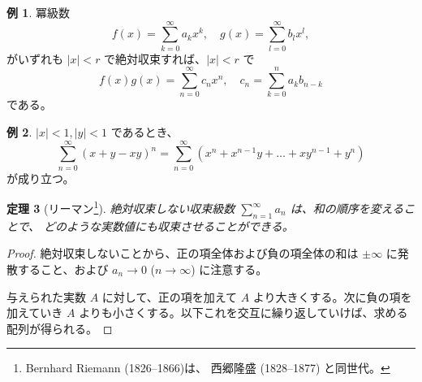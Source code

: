 \documentclass[a4paper]{jsarticle}
\newtheorem{Theorem}{定理}[section]
\theoremstyle{definition}
\newtheorem{Example}[Theorem]{例}
\newtheorem{Exercise}{問}%
\theoremstyle{remark}
\begin{document}
\begin{Example}
冪級数
\[
f(x) = \sum_{k=0}^\infty a_kx^k, 
\quad 
g(x) = \sum_{l=0}^\infty b_lx^l, 
\]
がいずれも $|x| < r$ で絶対収束すれば、$|x| < r$ で
\[
f(x)g(x) = \sum_{n=0}^\infty c_n x^n, 
\quad 
c_n = \sum_{k=0}^n a_k b_{n-k}
\]
である。
\end{Example} 



\begin{Example}
$|x| < 1, |y| < 1$ であるとき、
\[
\sum_{n=0}^\infty (x+y-xy)^n = \sum_{n=0}^\infty 
(x^n + x^{n-1}y + \dots + xy^{n-1} + y^n)
\]
が成り立つ。
\end{Example}


\begin{Theorem}[リーマン\footnote{Bernhard Riemann (1826--1866)は、
西郷隆盛 (1828--1877) と同世代。}]
絶対収束しない収束級数 $\sum_{n=1}^\infty a_n$ は、和の順序を変えることで、
どのような実数値にも収束させることができる。
\end{Theorem} 

\begin{proof}
絶対収束しないことから、正の項全体および負の項全体の和は $\pm\infty$ に発散すること、および
$a_n \to 0$ ($n \to \infty$) に注意する。

与えられた実数 $A$ に対して、正の項を加えて $A$ より大きくする。次に負の項を加えていき
$A$ よりも小さくする。以下これを交互に繰り返していけば、求める配列が得られる。
\end{proof} 
\end{document}
